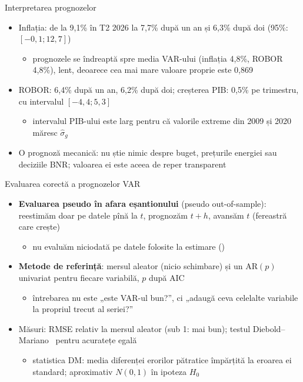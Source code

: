 \begin{frame}{Interpretarea prognozelor}
\itemsize{\small}
\begin{itemize}
    \item Inflația: de la 9{,}1\% în T2 2026 la 7{,}7\% după un an și 6{,}3\% după doi (95\%: $[-0{,}1; 12{,}7]$)
    \begin{itemize}
        \item prognozele se îndreaptă spre media VAR-ului (inflația 4{,}8\%, ROBOR 4{,}8\%), lent, deoarece cea mai mare valoare proprie este 0{,}869
    \end{itemize}
    \item ROBOR: 6{,}4\% după un an, 6{,}2\% după doi; creșterea PIB: 0{,}5\% pe trimestru, cu intervalul $[-4{,}4; 5{,}3]$
    \begin{itemize}
        \item intervalul PIB-ului este larg pentru că valorile extreme din 2009 și 2020 măresc $\hat\sigma_g$
    \end{itemize}
    \item O prognoză mecanică: nu știe nimic despre buget, prețurile energiei sau deciziile BNR; valoarea ei este aceea de reper transparent
\end{itemize}
\end{frame}

\begin{frame}{Evaluarea corectă a prognozelor VAR}
\itemsize{\small}
\begin{itemize}
    \item \textbf{Evaluarea pseudo în afara eșantionului} (pseudo out-of-sample): reestimăm doar pe datele pînă la $t$, prognozăm $t + h$, avansăm $t$ (fereastră care crește)
    \begin{itemize}
        \item nu evaluăm niciodată pe datele folosite la estimare ()
    \end{itemize}
    \item \textbf{Metode de referință}: mersul aleator (nicio schimbare) și un AR$(p)$ univariat pentru fiecare variabilă, $p$ după AIC
    \begin{itemize}
        \item întrebarea nu este „este VAR-ul bun?”, ci „adaugă ceva celelalte variabile la propriul trecut al seriei?”
    \end{itemize}
    \item Măsuri: RMSE relativ la mersul aleator (sub 1: mai bun); testul Diebold--Mariano \ pentru acuratețe egală
    \begin{itemize}
        \item statistica DM: media diferenței erorilor pătratice împărțită la eroarea ei standard; aproximativ $N(0, 1)$ în ipoteza $H_0$
    \end{itemize}
\end{itemize}
\end{frame}


